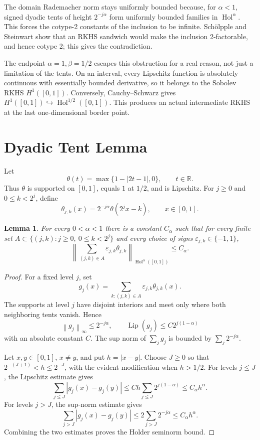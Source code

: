 \documentclass[11pt]{article}
\newtheorem{lemma}{Lemma}
\newcommand{\R}{\mathbb{R}}
\newcommand{\Hol}{\operatorname{Hol}}
\newcommand{\norm}[1]{\left\lVert #1\right\rVert}
\newcommand{\abs}[1]{\left\lvert #1\right\rvert}
\begin{document}
The domain Rademacher norm stays uniformly bounded because, for
\(\alpha<1\), signed dyadic tents of height \(2^{-j\alpha}\) form uniformly
bounded families in \(\Hol^\alpha\). This forces the cotype-2 constants of the
inclusion to be infinite. Sch\"olpple and Steinwart show that an RKHS sandwich
would make the inclusion 2-factorable, and hence cotype 2; this gives the
contradiction.

The endpoint \(\alpha=1,\beta=1/2\) escapes this obstruction for a real reason,
not just a limitation of the tents. On an interval, every Lipschitz function is
absolutely continuous with essentially bounded derivative, so it belongs to
the Sobolev RKHS \(H^1([0,1])\). Conversely, Cauchy--Schwarz gives
\(H^1([0,1])\hookrightarrow\Hol^{1/2}([0,1])\). This produces an actual
intermediate RKHS at the last one-dimensional border point.

\section*{Dyadic Tent Lemma}

Let
\[
  \theta(t)=\max\{1-\abs{2t-1},0\}, \qquad t\in\R .
\]
Thus \(\theta\) is supported on \([0,1]\), equals \(1\) at \(1/2\), and is
Lipschitz. For \(j\ge 0\) and \(0\le k<2^j\), define
\[
  \theta_{j,k}(x)=2^{-j\alpha}\theta(2^j x-k),\qquad x\in[0,1].
\]

\begin{lemma}\label{lem:tents}
For every \(0<\alpha<1\) there is a constant \(C_\alpha\) such that for every
finite set \(A\subset\{(j,k):j\ge0,\ 0\le k<2^j\}\) and every choice of signs
\(\varepsilon_{j,k}\in\{-1,1\}\),
\[
  \left\|\sum_{(j,k)\in A}\varepsilon_{j,k}\theta_{j,k}
  \right\|_{\Hol^\alpha([0,1])}\le C_\alpha .
\]
\end{lemma}

\begin{proof}
For a fixed level \(j\), set
\[
  g_j(x)=\sum_{k:(j,k)\in A}\varepsilon_{j,k}\theta_{j,k}(x).
\]
The supports at level \(j\) have disjoint interiors and meet only where both
neighboring tents vanish. Hence
\[
  \norm{g_j}_\infty\le 2^{-j\alpha},
  \qquad
  \operatorname{Lip}(g_j)\le C2^{j(1-\alpha)}
\]
with an absolute constant \(C\). The sup norm of \(\sum_j g_j\) is bounded by
\(\sum_j2^{-j\alpha}\).

Let \(x,y\in[0,1]\), \(x\ne y\), and put \(h=\abs{x-y}\). Choose \(J\ge0\) so
that \(2^{-(J+1)}<h\le 2^{-J}\), with the evident modification when
\(h>1/2\). For levels \(j\le J\), the Lipschitz estimate gives
\[
  \sum_{j\le J}\abs{g_j(x)-g_j(y)}
  \le C h\sum_{j\le J}2^{j(1-\alpha)}
  \le C_\alpha h^\alpha .
\]
For levels \(j>J\), the sup-norm estimate gives
\[
  \sum_{j>J}\abs{g_j(x)-g_j(y)}
  \le 2\sum_{j>J}2^{-j\alpha}
  \le C_\alpha h^\alpha .
\]
Combining the two estimates proves the Holder seminorm bound.
\end{proof}
\end{document}
